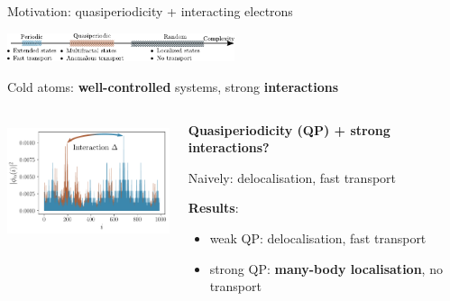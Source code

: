 \begin{frame}{Motivation: quasiperiodicity + interacting electrons}
{
\centering
\includegraphics[width=0.5\textwidth]{img/1_motivation/complexity}

}

Cold atoms: \textbf{well-controlled} systems, strong \textbf{interactions}

\begin{columns}
\begin{column}{0.4\textwidth}
\centering
\includegraphics[height=3.5cm]{img/0_cover/free_two_densities_interaction}
\end{column}
\begin{column}{0.6\textwidth}
\textbf{Quasiperiodicity (QP) + strong interactions?}

Naively: delocalisation, fast transport

\textbf{Results}: 
\begin{itemize}
	\item weak QP: delocalisation, fast transport
	\item strong QP: \textbf{many-body localisation}, no transport
\end{itemize}
\end{column}
\end{columns}
\end{frame}

